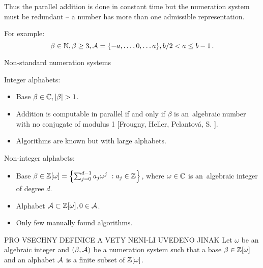   Thus the parallel addition is done in constant time but the numeration system must be redundant -- a number has more than one admissible representation.
  
  
  For example:
  $$
  \beta \in \mathbb{N}, \beta \geq 3, \mathcal{A}=\{-a, \dots, 0, \dots a\}, b/2 <a \leq b-1\,. 
  $$
    
    
    
        {Non-standard numeration systems}
    
    Integer alphabets:
    \begin{itemize}
        \item Base $\beta \in \CC, |\beta|>1$.
        
        \item Addition is computable in parallel if and only if $\beta$ is an~algebraic number with no conjugate of modulus 1 [Frougny, Heller, Pelantov\'a, S. ].
        
        \item Algorithms are known but with large alphabets.
    \end{itemize}
    
    
    Non-integer alphabets:
    \begin{itemize}
        \item Base $\beta \in \mathbb{Z}[\omega]= \left\{\sum_{j=0}^{d-1} a_j \omega^j\ : a_j \in \mathbb{Z} \right\}$, where $\omega \in \mathbb{C}$ is an~algebraic integer of degree $d$.
        
        \item Alphabet $\mathcal{A} \subset \mathbb{Z}[\omega] , 0\in \mathcal{A}$.
        
        \item Only few manually found algorithms. 
    \end{itemize}
    
    PRO VSECHNY DEFINICE A VETY NENI-LI UVEDENO JINAK
     Let $\omega$ be an algebraic integer and $(\beta,\mathcal{A})$ be a numeration system such that a base $\beta \in \mathbb{Z}[\omega]$ and an alphabet $\mathcal{A}$ is a finite subset of $\mathbb{Z}[\omega]$. 